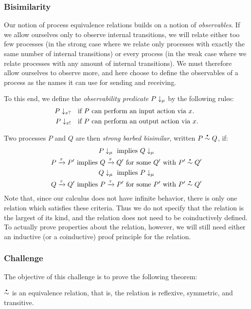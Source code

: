\subsubsection{Bisimilarity}
Our notion of process equivalence relations builds on a notion of \emph{observables}.
If we allow ourselves only to observe internal transitions, we will relate either too few processes (in the strong case where we relate only processes with exactly the same number of internal transitions) or every process (in the weak case where we relate processes with any amount of internal transitions).
We must therefore allow ourselves to observe more, and here choose to define the observables of a process as the names it can use for sending and receiving.

To this end, we define the \emph{observability predicate} \( P\downarrow_{\mu} \) by the following rules:
\begin{align}
  P\downarrow_{x?}  &\quad \textrm{if \( P \) can perform an input action via \( x \).} \\
  P\downarrow_{x!} &\quad \textrm{if \( P \) can perform an output action via \( x \).}
\end{align}

Two processes \( P \) and \( Q \) are then \emph{strong barbed bisimilar}, written \( \sbbisim{P}{Q} \), if:
\begin{gather}
  \observable{P}{\mu}~\textrm{implies}~\observable{Q}{\mu} \\
  \transition{P}{\Atau}{P'}~\textrm{implies}~\transition{Q}{\Atau}{Q'}~\textrm{for some \( Q' \) with}~\sbbisim{P'}{Q'} \\
  \observable{Q}{\mu}~\textrm{implies}~\observable{P}{\mu} \\
  \transition{Q}{\Atau}{Q'}~\textrm{implies}~\transition{P}{\Atau}{P'}~\textrm{for some \( P' \) with}~\sbbisim{P'}{Q'}
\end{gather}
Note that, since our calculus does not have infinite behavior, there is only one relation which satisfies these criteria.
Thus we do not specify that the relation is the largest of its kind, and the relation does not need to be coinductively defined.
To actually prove properties about the relation, however, we will still need either an inductive (or a coinductive) proof principle for the relation.

\subsubsection{Challenge}
The objective of this challenge is to prove the following theorem:
\begin{theorem}
  \( \sbbisim{}{} \) is an equivalence relation, that is, the relation is reflexive, symmetric, and transitive.
\end{theorem}

